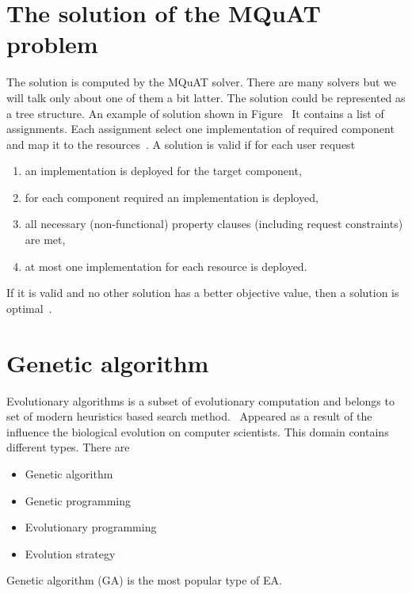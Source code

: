 \section{The solution of the MQuAT problem}
The solution is computed by the MQuAT solver. There are many solvers but we will talk only about one of them a bit latter.
The solution could be represented as a tree structure. An example of solution shown in Figure~\label{SolutionModel}
It contains a list of assignments. Each assignment select one implementation of required component and map it to the resources~\cite{gotz18}.
A solution is valid if for each user request
\begin{enumerate}
	\item an implementation is deployed for the target component,
	\item for each component required an implementation is deployed,
	\item all necessary (non-functional) property clauses (including request constraints) are met,
	\item at most one implementation for each resource is deployed.
\end{enumerate}
If it is valid and no other solution has a better objective value, then a solution is optimal~\cite{gotz18}.
     
\section{Genetic algorithm}
Evolutionary algorithms is a subset of evolutionary computation and belongs to set of modern heuristics based search method.~\cite{vikhar16}
Appeared as a result of the influence the biological evolution on computer scientists. This domain contains different types.
There are
\begin{itemize}
	\item Genetic algorithm 
	\item Genetic programming
	\item Evolutionary programming
	\item Evolution strategy
\end{itemize}

Genetic algorithm (GA) is the most popular type of EA.

